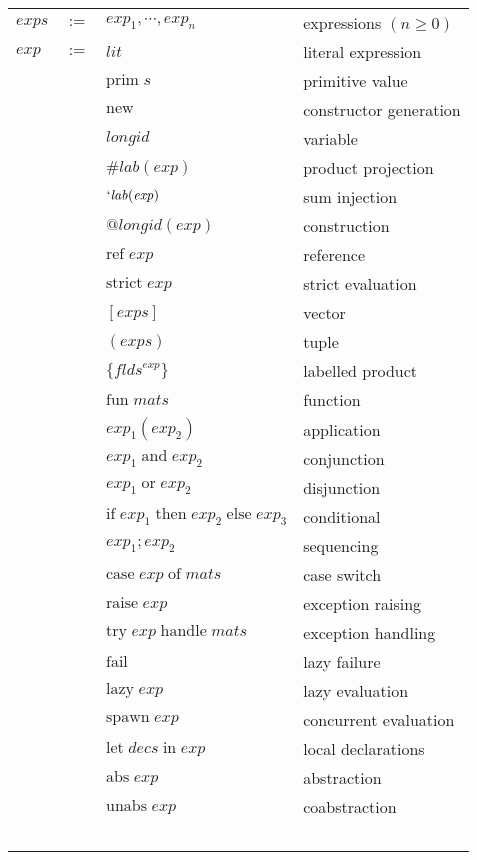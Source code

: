\documentclass[twoside]{article}
\newcommand{\x}[1]{\mathit{#1}}
\newcommand{\f}[1]{\mbox{#1}}
\newcommand{\lab}{\x{lab}}
\newcommand{\longid}{\x{longid}}
\newcommand{\lit}{\x{lit}}
\renewcommand{\exp}{\x{exp}}
\newcommand{\exps}{\x{exps}}
\newcommand{\flds}{\x{flds}}
\newcommand{\mats}{\x{mats}}
\newcommand{\decs}{\x{decs}}
\begin{document}
\begin{center}
\begin{tabular}{lcll}

$\exps$	&$:=$&	$\exp_1,\cdots,\exp_n$		& expressions $(n\geq0)$ \\
$\exp$	&$:=$&	$\lit$				& literal expression \\
	&&	$\f{prim}\;\x{s}$		& primitive value \\
	&&	$\f{new}$			& constructor generation \\
	&&	$\longid$			& variable \\
	&&	$\#\lab(\exp)$			& product projection \\
	&&	$`\lab(\exp)$			& sum injection \\
	&&	$@\longid(\exp)$		& construction \\
	&&	$\f{ref}\;\exp$			& reference \\
	&&	$\f{strict}\;\exp$		& strict evaluation \\
	&&	$[\exps]$			& vector \\
	&&	$(\exps)$			& tuple \\
	&&	$\{\flds^\exp\}$		& labelled product \\
	&&	$\f{fun}\;\mats$		& function \\
	&&	$\exp_1(\exp_2)$		& application \\
	&&	$\exp_1\;\f{and}\;\exp_2$	& conjunction \\
	&&	$\exp_1\;\f{or}\;\exp_2$	& disjunction \\
	&&	$\f{if}\;\exp_1\;\f{then}\;\exp_2\;\f{else}\;\exp_3$
						& conditional \\
	&&	$\exp_1;\exp_2$			& sequencing \\
	&&	$\f{case}\;\exp\;\f{of}\;\mats$ & case switch \\
	&&	$\f{raise}\;\exp$		& exception raising \\
	&&	$\f{try}\;\exp\;\f{handle}\;\mats$ & exception handling \\
	&&	$\f{fail}$			& lazy failure \\
	&&	$\f{lazy}\;\exp$		& lazy evaluation \\
	&&	$\f{spawn}\;\exp$		& concurrent evaluation \\
	&&	$\f{let}\;\decs\;\f{in}\;\exp$	& local declarations \\
	&&	$\f{abs}\;\exp$			& abstraction \\
	&&	$\f{unabs}\;\exp$		& coabstraction \\
\ \\


\end{tabular}
\end{center}
\end{document}
